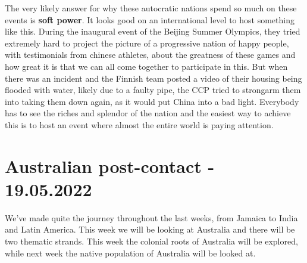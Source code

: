 \documentclass{article}
\begin{document}
	The very likely answer for why these autocratic nations spend so much on these events is \textbf{soft power}. It looks good on an international level to host something like this. During the inaugural event of the Beijing Summer Olympics, they tried extremely hard to project the picture of a progressive nation of happy people, with testimonials from chinese athletes, about the greatness of these games and how great it is that we can all come together to participate in this. But when there was an incident and the Finnish team posted a video of their housing being flooded with water, likely due to a faulty pipe, the CCP tried to strongarm them into taking them down again, as it would put China into a bad light. Everybody has to see the riches and splendor of the nation and the easiest way to achieve this is to host an event where almost the entire world is paying attention.

	\section{Australian post-contact - 19.05.2022}

	We've made quite the journey throughout the last weeks, from Jamaica to India and Latin America. This week we will be looking at Australia and there will be two thematic strands. This week the colonial roots of Australia will be explored, while next week the native population of Australia will be looked at. \\
\end{document}
